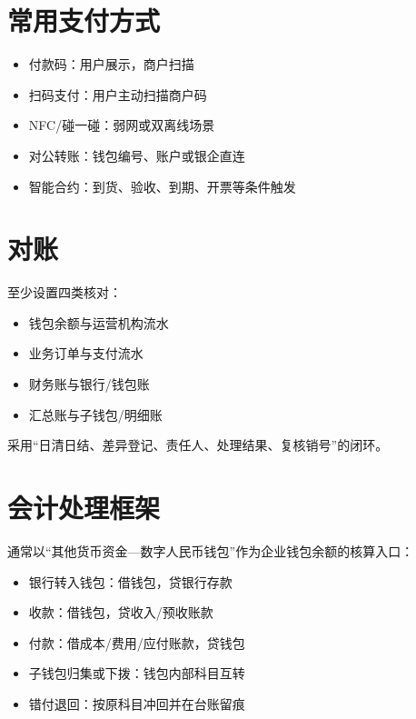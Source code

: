 \section{常用支付方式}\label{ux5e38ux7528ux652fux4ed8ux65b9ux5f0f}

\begin{itemize}
\tightlist
\item
  付款码：用户展示，商户扫描
\item
  扫码支付：用户主动扫描商户码
\item
  NFC/碰一碰：弱网或双离线场景
\item
  对公转账：钱包编号、账户或银企直连
\item
  智能合约：到货、验收、到期、开票等条件触发
\end{itemize}

\section{对账}\label{ux5bf9ux8d26}

至少设置四类核对：

\begin{itemize}
\tightlist
\item
  钱包余额与运营机构流水
\item
  业务订单与支付流水
\item
  财务账与银行/钱包账
\item
  汇总账与子钱包/明细账
\end{itemize}

采用``日清日结、差异登记、责任人、处理结果、复核销号''的闭环。

\section{会计处理框架}\label{ux4f1aux8ba1ux5904ux7406ux6846ux67b6}

通常以``其他货币资金---数字人民币钱包''作为企业钱包余额的核算入口：

\begin{itemize}
\tightlist
\item
  银行转入钱包：借钱包，贷银行存款
\item
  收款：借钱包，贷收入/预收账款
\item
  付款：借成本/费用/应付账款，贷钱包
\item
  子钱包归集或下拨：钱包内部科目互转
\item
  错付退回：按原科目冲回并在台账留痕
\end{itemize}

